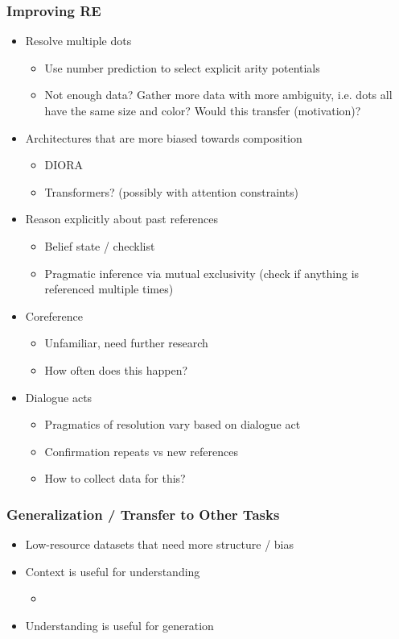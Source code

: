 \documentclass{beamer}
\begin{document}
\begin{frame}
\frametitle{Improving RE}
\begin{itemize}
    \item Resolve multiple dots
        \begin{itemize}
        \item Use number prediction to select explicit arity potentials
        \item Not enough data? Gather more data with more ambiguity, i.e. dots
            all have the same size and color? Would this transfer (motivation)?
        \end{itemize}
    \item Architectures that are more biased towards composition
        \begin{itemize}
        \item DIORA
        \item Transformers? (possibly with attention constraints)
        \end{itemize}
    \item Reason explicitly about past references
        \begin{itemize}
        \item Belief state / checklist
        \item Pragmatic inference via mutual exclusivity
            (check if anything is referenced multiple times)
        \end{itemize}
    \item Coreference
        \begin{itemize}
        \item Unfamiliar, need further research
        \item How often does this happen?
        \end{itemize}
   \item Dialogue acts
        \begin{itemize}
        \item Pragmatics of resolution vary based on dialogue act
        \item Confirmation repeats vs new references
        \item How to collect data for this?
        \end{itemize}
\end{itemize}
\end{frame}

\begin{frame}
\frametitle{Generalization / Transfer to Other Tasks}
\begin{itemize}
\item Low-resource datasets that need more structure / bias
\item Context is useful for understanding
    \begin{itemize}
    \item 
    \end{itemize}
\item Understanding is useful for generation
\end{itemize}
\end{frame}
\end{document}
